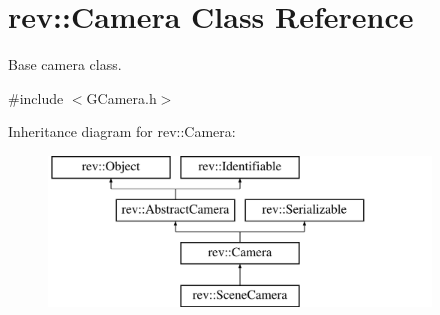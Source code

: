 \hypertarget{classrev_1_1_camera}{}\section{rev\+::Camera Class Reference}
\label{classrev_1_1_camera}


Base camera class.  




{\ttfamily \#include $<$G\+Camera.\+h$>$}

Inheritance diagram for rev\+::Camera\+:\begin{figure}[H]
\begin{center}
\leavevmode
\includegraphics[height=4.000000cm]{classrev_1_1_camera}
\end{center}
\end{figure}
